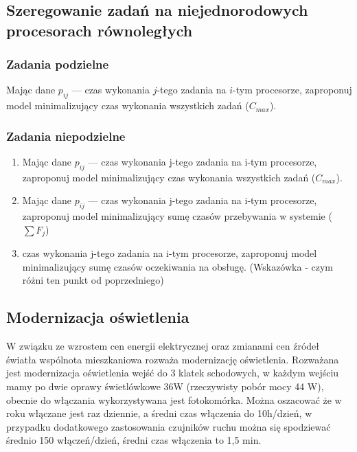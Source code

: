 \documentclass[
    12pt, %
]{../fphw}
\begin{document}
\subsection{Szeregowanie zadań na niejednorodowych procesorach równoległych}
\subsubsection{Zadania podzielne}
Mając dane \(p_{ij}\) — czas wykonania \(j\)-tego zadania na \(i\)-tym procesorze,
zaproponuj model minimalizujący czas wykonania wszystkich zadań (\(C_{max}\)).
\subsubsection{Zadania niepodzielne}
\begin{enumerate}[label=(\alph*)]
    \item Mając dane \(p_{ij}\) — czas wykonania j-tego zadania na i-tym procesorze,
          zaproponuj model minimalizujący czas wykonania wszystkich
          zadań (\(C_{max}\)).
    \item Mając dane \(p_{ij}\) — czas wykonania j-tego zadania na i-tym procesorze,
          zaproponuj model minimalizujący sumę czasów przebywania w
          systemie (\(\sum F_j\))
    \item czas wykonania j-tego zadania na i-tym procesorze,
          zaproponuj model minimalizujący sumę czasów oczekiwania na obsługę.
          (Wskazówka - czym różni ten punkt od poprzedniego)
\end{enumerate}

\subsection{Modernizacja oświetlenia}
W związku ze wzrostem cen energii elektrycznej oraz zmianami cen źródeł światła wspólnota mieszkaniowa rozważa modernizację oświetlenia. 
Rozważana jest modernizacja oświetlenia wejść do 3 klatek schodowych, w każdym wejściu
mamy po dwie oprawy świetlówkowe 36W (rzeczywisty pobór mocy 44 W),
obecnie do włączania wykorzystywana jest fotokomórka. Można oszacować
że w roku włączane jest raz dziennie, a średni czas włączenia do 10h/dzień, w
przypadku dodatkowego zastosowania czujników ruchu można się spodziewać
średnio 150 włączeń/dzień, średni czas włączenia to 1,5 min.
\end{document}
